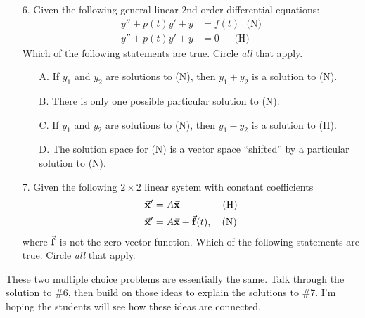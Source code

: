 \documentclass[epsf]{article}
\begin{document}
\begin{itemize}
 \item[6.] Given the following general linear 2nd order differential equations:
\begin{align*}
y'' +p(t)y' +y &= f(t) \ \ \ \text{(N)}\\
y'' +p(t)y' +y &= 0\ \ \ \ \ \ \ \text{(H)}
\end{align*}
Which of the following statements are true.  Circle \textit{all} that apply.
\begin{itemize}
\item[A.] If $y_1$ and $y_2$ are solutions to (N), then $y_1+y_2$ is a solution to (N).
\item[B.] There is only one possible particular solution to (N).
\item[C.] If $y_1$ and $y_2$ are solutions to (N), then $y_1 - y_2$ is  a solution to (H).
\item[D.] The solution space for (N) is a vector space ``shifted'' by a particular solution to (N).
\end{itemize}


\item[7.] Given the following $2\times 2$ linear system with constant coefficients
\begin{align*}
\vec{\bf x} ' &= A\vec{\bf x} \ \ \ \ \ \ \ \ \ \ \ \ \ \text{(H)}\\
\vec{\bf x} ' &= A\vec{\bf x} + \vec{\bf f}(t), \ \ \  \text{(N)}
\end{align*}
where $\vec{\bf f}$ is not the zero vector-function.  Which of the following statements are true.  Circle \textit{all} that apply.

\end{itemize}

 These two multiple choice problems are essentially the same.   Talk through the solution to \#6, then build on those ideas to explain the solutions to \#7.  I'm hoping the students will see how these ideas are connected.\\
\end{document}
